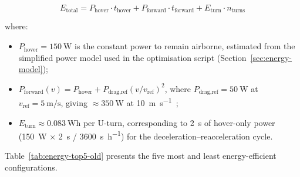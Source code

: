 \begin{equation}\label{eq:energy-model-old}
  E_{\text{total}} = P_{\text{hover}} \cdot t_{\text{hover}} + P_{\text{forward}} \cdot t_{\text{forward}} + E_{\text{turn}} \cdot n_{\text{turns}}
\end{equation}

\noindent where:
\begin{itemize}
  \item $P_{\text{hover}} = \SI{150}{\watt}$ is the constant power to remain airborne, estimated from the simplified power model used in the optimisation script (Section~\ref{sec:energy-model});
  \item $P_{\text{forward}}(v) = P_{\text{hover}} + P_{\text{drag,ref}} (v/v_{\text{ref}})^2$, where $P_{\text{drag,ref}} = \SI{50}{\watt}$ at $v_{\text{ref}} = \SI{5}{\metre\per\second}$, giving $\approx\!\SI{350}{\watt}$ at \SI{10}{\metre\per\second}~\cite{stolaroff2018energy};
  \item $E_{\text{turn}} \approx \SI{0.083}{\watt\hour}$ per U-turn, corresponding to \SI{2}{\second} of hover-only power (\SI{150}{\watt} $\times$ \SI{2}{\second} / \SI{3600}{\second\per\hour}) for the deceleration--reacceleration cycle.
\end{itemize}

Table~\ref{tab:energy-top5-old} presents the five most and least energy-efficient configurations.

